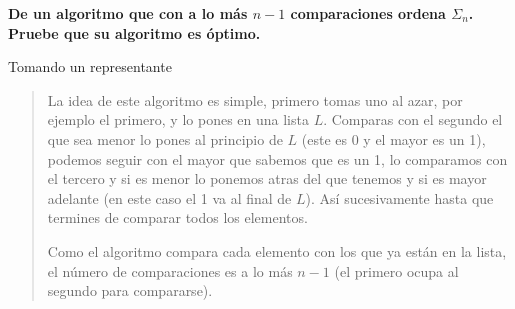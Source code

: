 \textbf{De un algoritmo que con a lo más $n - 1$ comparaciones ordena $\Sigma_n$. Pruebe que su algoritmo es óptimo.}\vspace{.2cm}

\textcolor{bibi}{Tomando un representante}
\begin{quote}
    La idea de este algoritmo es simple, primero tomas uno al azar, por ejemplo el primero, y lo pones en una lista $L$. Comparas con el segundo el que sea menor lo pones al principio de $L$ (este es 0 y el mayor es un 1), podemos seguir con el mayor que sabemos que es un 1, lo comparamos con el tercero y si es menor lo ponemos atras del que tenemos y si es mayor adelante (en este caso el 1 va al final de $L$). Así sucesivamente hasta que termines de comparar todos los elementos.\vspace{.2cm}

    Como el algoritmo compara cada elemento con los que ya están en la lista, el número de comparaciones es a lo más $n - 1$ (el primero ocupa al segundo para compararse).\vspace{.2cm}

    
\end{quote}

\newpage